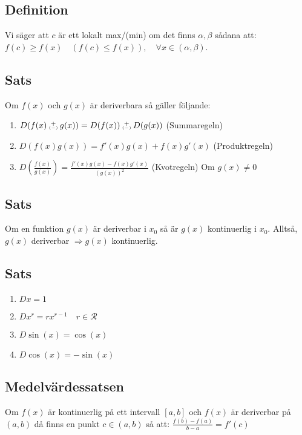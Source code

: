 \documentclass{article}
\newcommand\varpm{\mathbin{\vcenter{\hbox{%
  \oalign{\hfil$\scriptstyle+$\hfil\cr
          \noalign{\kern-.3ex}
          $\scriptscriptstyle({-})$\cr}%
}}}}
\begin{document}
\subsection{Definition}
Vi säger att $c$ är ett lokalt max/(min) om det finns $\alpha,\beta$ sådana att:\\ $f(c)\geq f(x)\quad (f(c)\leq f(x)),\quad \forall x \in (\alpha, \beta)$.\\

\subsection{Sats}
Om $f(x)$ och $g(x)$ är deriverbara så gäller följande:

\begin{enumerate}
   \item $D(f(x)\varpm g(x))=D(f(x))\varpm D(g(x))$ (Summaregeln)
   \item $D(f(x)g(x))=f'(x)g(x)+f(x)g'(x)$ (Produktregeln)
   \item $D(\frac{f(x)}{g(x)})=\frac{f'(x)g(x)-f(x)g'(x)}{(g(x))^2}$ (Kvotregeln) Om $g(x)\neq 0$
\end{enumerate}

\subsection{Sats}
Om en funktion $g(x)$ är deriverbar i $x_{0}$ så är $g(x)$ kontinuerlig i $x_{0}$. Alltså,\\
$g(x)$ deriverbar $\Rightarrow g(x)$ kontinuerlig.

\subsection{Sats}
\begin{enumerate}
   \item $Dx=1$
   \item $Dx^r=rx^{r-1} \quad r \in \mathcal{R}$
   \item $D\sin(x)=\cos(x)$
   \item $D\cos(x)=-\sin(x)$
\end{enumerate}

\subsection{Medelvärdessatsen}
Om $f(x)$ är kontinuerlig på ett intervall $[a,b]$ och $f(x)$ är deriverbar på $(a,b)$ då finns en punkt $c\in (a,b)$ så att: $\frac{f(b)-f(a)}{b-a}=f'(c)$
\end{document}
